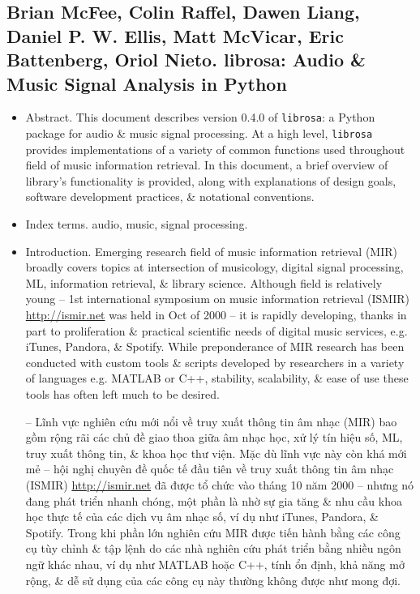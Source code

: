 \documentclass{article}
\begin{document}
\subsection{{\sc Brian McFee, Colin Raffel, Dawen Liang, Daniel P. W. Ellis, Matt McVicar, Eric Battenberg, Oriol Nieto}. librosa: Audio \& Music Signal Analysis in Python}
{\sf[3562 citations]}
\begin{itemize}
	\item {\sf Abstract.} This document describes version 0.4.0 of {\tt librosa}: a Python package for audio \& music signal processing. At a high level, {\tt librosa} provides implementations of a variety of common functions used throughout field of music information retrieval. In this document, a brief overview of library's functionality is provided, along with explanations of design goals, software development practices, \& notational conventions.
	\item {\sf Index terms.} audio, music, signal processing.
	\item {\sf Introduction.} Emerging research field of music information retrieval (MIR) broadly covers topics at intersection of musicology, digital signal processing, ML, information retrieval, \& library science. Although field is relatively young -- 1st international symposium on music information retrieval (ISMIR) \url{http://ismir.net} was held in Oct of 2000 -- it is rapidly developing, thanks in part to proliferation \& practical scientific needs of digital music services, e.g. iTunes, Pandora, \& Spotify. While preponderance of MIR research has been conducted with custom tools \& scripts developed by researchers in a variety of languages e.g. MATLAB or C++, stability, scalability, \& ease of use these tools has often left much to be desired.
	
	-- Lĩnh vực nghiên cứu mới nổi về truy xuất thông tin âm nhạc (MIR) bao gồm rộng rãi các chủ đề giao thoa giữa âm nhạc học, xử lý tín hiệu số, ML, truy xuất thông tin, \& khoa học thư viện. Mặc dù lĩnh vực này còn khá mới mẻ -- hội nghị chuyên đề quốc tế đầu tiên về truy xuất thông tin âm nhạc (ISMIR) \url{http://ismir.net} đã được tổ chức vào tháng 10 năm 2000 -- nhưng nó đang phát triển nhanh chóng, một phần là nhờ sự gia tăng \& nhu cầu khoa học thực tế của các dịch vụ âm nhạc số, ví dụ như iTunes, Pandora, \& Spotify. Trong khi phần lớn nghiên cứu MIR được tiến hành bằng các công cụ tùy chỉnh \& tập lệnh do các nhà nghiên cứu phát triển bằng nhiều ngôn ngữ khác nhau, ví dụ như MATLAB hoặc C++, tính ổn định, khả năng mở rộng, \& dễ sử dụng của các công cụ này thường không được như mong đợi.
	

\end{itemize}
\end{document}
